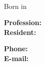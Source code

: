 \documentclass{./../lib/resume}
\begin{document}
\iftoggle{Dev}{\par}{}
\noindent\parbox{57mm}
{\parbox{57mm}{\raggedright\Huge\bfseries\color{cyan}\fullName}\\\parbox{57mm}{\centering Born in \bornData}}\quad\quad\parbox{62mm}
{\textbf{Profession:} \ProfessionI\\\textbf{Resident:} \fullAddress}\quad\parbox{62mm}
{\textbf{Phone:} \mobilePhoneI\\\textbf{E-mail:} \emailI}

\descriptions

\craft

\workExperience

\teaching

\project

\education

\publication

\LicensesCertifications

\honorsAwards

\training
\end{document}
